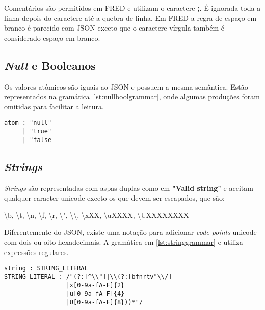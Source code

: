 Comentários são permitidos em FRED e utilizam o caractere \textbf{;}. É ignorada
toda a linha depois do caractere até a quebra de linha. Em FRED a regra de 
espaço em branco é parecido com JSON exceto que o caractere vírgula também
é considerado espaço em branco.

\subsection{\textit{Null} e Booleanos}

Os valores atômicos são iguais ao JSON e possuem a mesma semântica.
Estão representados na gramática \ref{lst:nullboolgrammar}, onde algumas produções
foram omitidas para facilitar a leitura.

\begin{lstlisting}[caption=Gramática para bools e null,label={lst:nullboolgrammar}]
atom : "null"
     | "true"
     | "false
\end{lstlisting}    

\subsection{\textit{Strings}}

\textit{Strings} são representadas com aspas duplas como em \textbf{"Valid string"} 
e aceitam qualquer caracter unicode exceto os que devem ser escapados,  
que são:

\begin{center}    
    \textbackslash b, \textbackslash t, \textbackslash n, \textbackslash f, 
    \textbackslash r, \textbackslash ", \textbackslash \textbackslash , \textbackslash xXX, 
    \textbackslash uXXXX, \textbackslash UXXXXXXXX
\end{center}

Diferentemente do JSON, existe uma notação para adicionar \textit{code points} unicode com 
dois ou oito hexadecimais. A gramática em \ref{lst:stringgrammar} e utiliza expressões
regulares.

\begin{lstlisting}[caption=Gramática para strings,label={lst:stringgrammar}]
string : STRING_LITERAL
STRING_LITERAL : /"(?:[^\\"]|\\(?:[bfnrtv"\\/]
                 |x[0-9a-fA-F]{2}
                 |u[0-9a-fA-F]{4}
                 |U[0-9a-fA-F]{8}))*"/
\end{lstlisting}    

